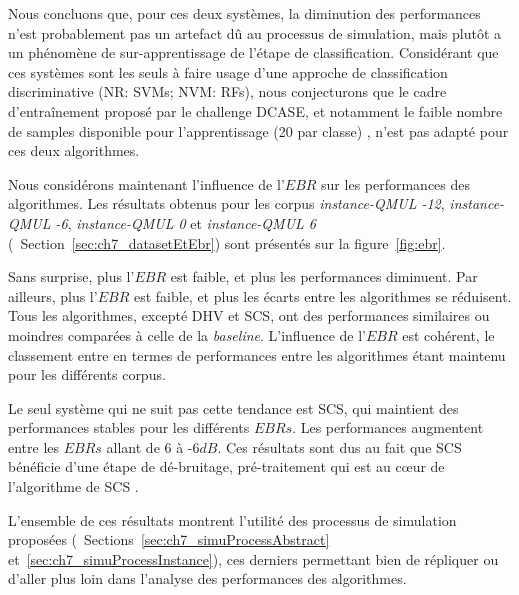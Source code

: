 Nous concluons que, pour ces deux systèmes, la diminution des performances n'est probablement pas un artefact dû au processus de simulation, mais plutôt a un phénomène de sur-apprentissage de l'étape de classification. Considérant que ces systèmes sont les seuls à faire usage d'une approche de classification discriminative (NR: SVMs; NVM: RFs), nous conjecturons que le cadre d'entraînement proposé par le challenge DCASE, et notamment le faible nombre de samples disponible pour l'apprentissage (20 par classe) , n'est pas adapté pour ces deux algorithmes.

Nous considérons maintenant l'influence de l'$EBR$ sur les performances des algorithmes. Les résultats obtenus pour les corpus \emph{instance-QMUL -12}, \emph{instance-QMUL -6}, \emph{instance-QMUL 0} et \emph{instance-QMUL 6} (\cf~Section~\ref{sec:ch7_datasetEtEbr}) sont présentés sur la figure~\ref{fig:ebr}. 

Sans surprise, plus l'$EBR$ est faible, et plus les performances diminuent. Par ailleurs, plus l'$EBR$ est faible, et plus les  écarts entre les algorithmes se réduisent. Tous les algorithmes, excepté DHV et SCS, ont des performances similaires ou moindres comparées à celle de la \emph{baseline}. L'influence de l'$EBR$ est cohérent, le classement entre en termes de performances entre les algorithmes étant maintenu pour les différents corpus. 

Le seul système qui ne suit pas cette tendance est SCS, qui maintient des performances stables pour les différents $EBRs$. Les performances augmentent entre les $EBRs$ allant de 6 à -6$dB$. Ces résultats sont dus au fait que SCS bénéficie d'une  étape de dé-bruitage, pré-traitement qui est au cœur de l'algorithme de SCS \citep{SCS}.

L'ensemble de ces résultats montrent l'utilité des processus de simulation proposées (\cf~Sections~\ref{sec:ch7_simuProcessAbstract} et~\ref{sec:ch7_simuProcessInstance}), ces derniers permettant bien de répliquer ou d'aller plus loin dans l'analyse des performances des algorithmes.

